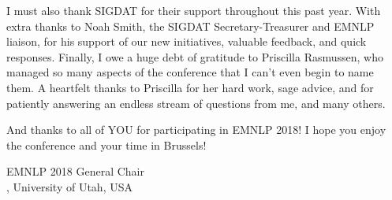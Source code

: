 I must also thank SIGDAT for their support throughout this past
year. With extra thanks to Noah Smith, the SIGDAT Secretary-Treasurer
and EMNLP liaison, for his support of our new initiatives, valuable
feedback, and quick responses. Finally, I owe a huge debt of gratitude
to Priscilla Rasmussen, who managed so many aspects of the conference
that I can't even begin to name them.  A heartfelt thanks to Priscilla
for her hard work, sage advice, and for patiently answering an endless
stream of questions from me, and many others.

And thanks to all of YOU for participating in EMNLP 2018! I hope you
enjoy the conference and your time in Brussels!

\vspace{3em}
\noindent
EMNLP 2018 General Chair\\


, University of Utah, USA\\




